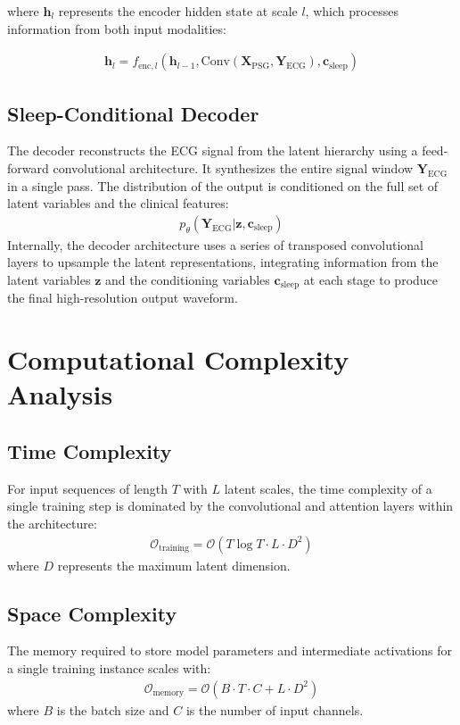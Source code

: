 \documentclass[10pt, conference]{IEEEtran}
\begin{document}
where $\mathbf{h}_l$ represents the encoder hidden state at scale $l$, which processes information from both input modalities:

\begin{align}
\mathbf{h}_l = f_{\text{enc},l}(\mathbf{h}_{l-1}, \text{Conv}(\mathbf{X}_{\text{PSG}}, \mathbf{Y}_{\text{ECG}}), \mathbf{c}_{\text{sleep}})
\end{align}

\subsection{Sleep-Conditional Decoder}

The decoder reconstructs the ECG signal from the latent hierarchy using a feed-forward convolutional architecture. It synthesizes the entire signal window $\mathbf{Y}_{\text{ECG}}$ in a single pass. The distribution of the output is conditioned on the full set of latent variables and the clinical features:
\begin{align}
p_\theta(\mathbf{Y}_{\text{ECG}} | \mathbf{z}, \mathbf{c}_{\text{sleep}})
\end{align}
Internally, the decoder architecture uses a series of transposed convolutional layers to upsample the latent representations, integrating information from the latent variables $\mathbf{z}$ and the conditioning variables $\mathbf{c}_{\text{sleep}}$ at each stage to produce the final high-resolution output waveform.

\section{Computational Complexity Analysis}

\subsection{Time Complexity}
For input sequences of length $T$ with $L$ latent scales, the time complexity of a single training step is dominated by the convolutional and attention layers within the architecture:
\begin{align}
\mathcal{O}_{\text{training}} = \mathcal{O}(T \log T \cdot L \cdot D^2)
\end{align}
where $D$ represents the maximum latent dimension.

\subsection{Space Complexity}
The memory required to store model parameters and intermediate activations for a single training instance scales with:
\begin{align}
\mathcal{O}_{\text{memory}} = \mathcal{O}(B \cdot T \cdot C + L \cdot D^2)
\end{align}
where $B$ is the batch size and $C$ is the number of input channels.
\end{document}
